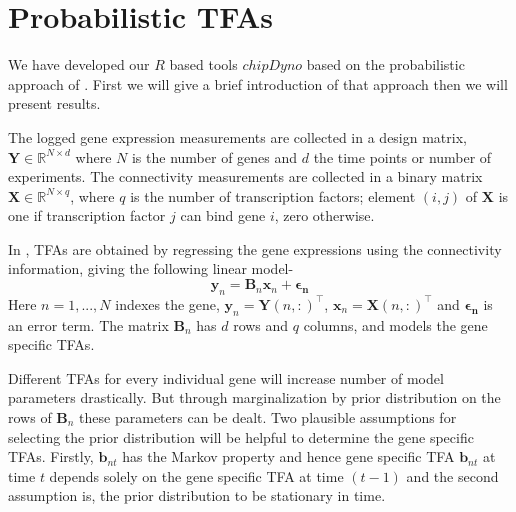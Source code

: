 \section{Probabilistic TFAs}\label{sec:Probabilistic_TFA}
We have developed our $R$ based tools $chipDyno$ based on the probabilistic approach of \cite{Sanguinetti:2006}. First we will give a brief introduction of that approach then we will present results.

The logged gene expression measurements are collected in a design matrix, $\textbf{Y} \in \mathbb{R}^{ N \times d}$ where $N$ is the number of genes and $d$ the time points or number of experiments. 
The connectivity measurements are collected in a binary matrix $\textbf{X} \in \mathbb{R} ^ {N \times q}$, where $q$ is the number of transcription factors; element $(i, j)$ of $\textbf{X}$ is one 
if transcription factor $j$ can bind gene $i$, zero otherwise.

In \cite{Sanguinetti:2006}, TFAs are obtained by regressing the gene expressions using the connectivity information, giving the following linear model- 
\begin{equation} \label{eq:linear_model_TFA}
\textbf{y}_n = \textbf{B}_n \textbf{x}_n + \boldsymbol{\epsilon_{n}}
\end{equation}
Here $n = 1, . . . ,N$ indexes the gene, $\textbf{y}_n =\textbf{Y}(n,:)^{\top}$, $\textbf{x}_n=\textbf{X}(n,:)^{\top}$ and $\boldsymbol{\epsilon_{n}}$ is an error term. The matrix $\textbf{B}_n$ has $d$ rows and $q$ columns, and models the gene specific TFAs.

Different TFAs for every individual gene will increase number of model parameters drastically. But through marginalization by prior distribution on the rows of $\textbf{B}_n$ these parameters can be dealt. Two plausible assumptions for selecting the prior distribution will be helpful to determine the gene specific TFAs. Firstly, $\textbf{b}_{nt}$ has the Markov property and hence gene specific TFA $\textbf{b}_{nt} $ at time $t$ depends solely on the gene specific TFA at time $(t-1)$ and the second assumption is, the prior distribution to be stationary in time.


